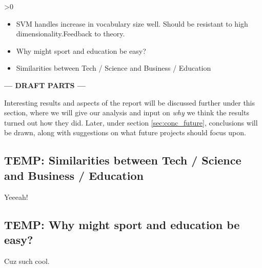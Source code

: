 \ifnum\printdraft>0
	\begin{itemize}
		\item SVM handles increase in vocabulary size well. Should be resistant to high dimensionality.Feedback to theory.
		\item Why might sport and education be easy?
		\item Similarities between Tech / Science and Business / Education
	\end{itemize}
\else
\begin{center}
	\textbf{--- DRAFT PARTS ---}
\end{center}
\fi
Interesting results and aspects of the report will be discussed further under this section, where we will give our analysis and input on \emph{why} we think the results turned out how they did. Later, under section \ref{sec:conc_future}, conclusions will be drawn, along with suggestions on what future projects should focus upon.

\subsection{TEMP: Similarities between Tech / Science and Business / Education} %
\label{sub:temp_similarities_between_tech_science_and_business_education}
Yeeeah!

\subsection{TEMP: Why might sport and education be easy?} %
\label{sub:temp_why_might_sport_and_education_be_easy_}
Cuz such cool.

